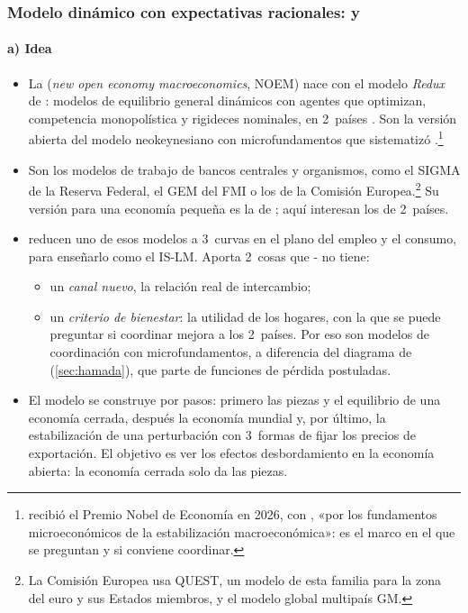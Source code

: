 \documentclass[11pt]{article}
\begin{document}
\subsubsection{Modelo dinámico con expectativas racionales:\cortetitulo {} y }\label{sec:corsetti-pesenti}

\paragraph{a) Idea}
\begin{itemize}
\item La  (\emph{new open economy macroeconomics}, NOEM) nace con el modelo \emph{Redux} de \textcite{ObstfeldRogoff1995Redux}: modelos de equilibrio general dinámicos con agentes que optimizan, competencia monopolística y rigideces nominales, en 2~países  . Son la versión abierta del modelo neokeynesiano con microfundamentos que sistematizó .\footnote{ recibió el Premio Nobel de Economía en 2026, con , «por los fundamentos microeconómicos de la estabilización macroeconómica»\nocite{Nobel2026Prensa}: es el marco en el que se preguntan  y  si conviene coordinar.}
\item Son los modelos de trabajo de bancos centrales y organismos, como el SIGMA de la Reserva Federal\nocite{ErcegGuerrieriGust2005}, el GEM del FMI\nocite{Bayoumi2004GEM} o los de la Comisión Europea.\footnote{La Comisión Europea usa QUEST, un modelo de esta familia para la zona del euro y sus Estados miembros\nocite{CE2026QUEST}, y el modelo global multipaís GM\nocite{CE2026GM}.} Su versión para una economía pequeña es la de \textcite{GaliMonacelli2005Monetary} ; aquí interesan los de 2~países.
\item \textcite{CorsettiPesenti2009} reducen uno de esos modelos a 3~curvas en el plano del empleo y el consumo, para enseñarlo como el IS-LM. Aporta 2~cosas que - no tiene:
  \begin{itemize}
  \item un \emph{canal nuevo}, la relación real de intercambio;
  \item un \emph{criterio de bienestar}: la utilidad de los hogares, con la que se puede preguntar si coordinar mejora a los 2~países. Por eso son modelos de coordinación con microfundamentos, a diferencia del diagrama de  (\ref{sec:hamada}), que parte de funciones de pérdida postuladas.
  \end{itemize}
\item El modelo se construye por pasos: primero las piezas y el equilibrio de una economía cerrada, después la economía mundial y, por último, la estabilización de una perturbación con 3~formas de fijar los precios de exportación. El objetivo es ver los efectos desbordamiento en la economía abierta: la economía cerrada solo da las piezas.
\end{itemize}
\end{document}
